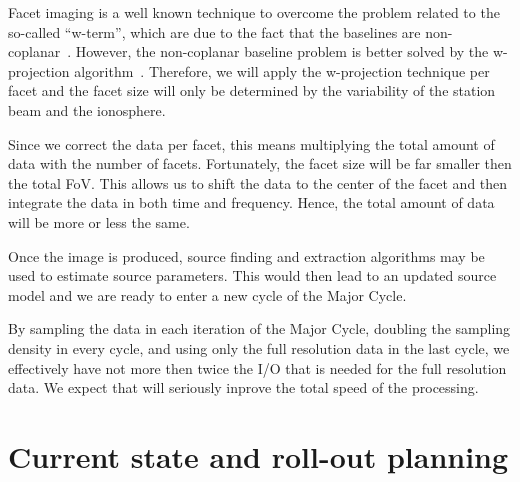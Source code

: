 \documentclass[journal]{IEEEtran}
\begin{document}
Facet imaging is a well known technique to overcome the problem related to the so-called ``w-term'', which are due to the fact that the baselines are non-coplanar~\cite{SIRAII:99}. However, the non-coplanar baseline problem is better solved by the w-projection algorithm~\cite{Cornwell:05}. Therefore, we will apply the w-projection technique per facet and the facet size will only be determined by the variability of the station beam and the ionosphere.

Since we correct the data per facet, this means multiplying the total amount of data with the number of facets. Fortunately, the facet size will be far smaller then the total FoV. This allows us to shift the data to the center of the facet and then integrate the data in both time and frequency. Hence, the total amount of data will be more or less the same.
  
Once the image is produced, source finding and extraction algorithms may be used to estimate source parameters. This would then lead to an updated source model and we are ready to enter a new cycle of the Major Cycle. 

By sampling the data in each iteration of the Major Cycle, doubling the sampling density in every cycle, and using only the full resolution data in the last cycle, we effectively have not more then twice the I/O that is needed for the full resolution data. We expect that will seriously inprove the total speed of the processing.


\section{Current state and roll-out planning}
\end{document}

